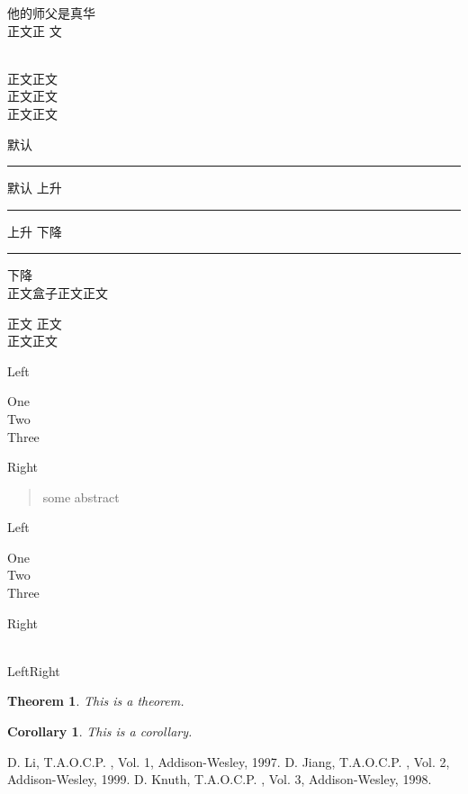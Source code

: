 \documentclass[UTF8,a5paper,12pt,portrait,openary,final]{ctexbook}
\begin{document}
他的师父是真华
\\
正文正 {\tiny 文}

\\



正文正文
\\
正文\hphantom{水平幻影}正文
\\
正文\vphantom{\Huge竖直幻影}正文



  \quad
{}
默认\rule{3pt}{14pt}默认
上升\rule[5pt]{3pt}{14pt}上升
下降\rule[-5pt]{3pt}{14pt}下降
\\


正文\mbox{盒子}正文正文

正文
正文\\
正文正文

Left\begin{minipage}{6em}
One\\ Two\\ Three
\end{minipage}Right

\begin{abstract}
some abstract
\end{abstract}


Left\parbox{6em}{One\\ Two\\ Three}Right

\\
LeftRight


\newtheorem{aaa}{Theorem}
\newtheorem{bbb}{Corollary}

\begin{aaa}
This is a theorem.
\end{aaa}
\begin{bbb}
This is a corollary.
\end{bbb}

\begin{thebibliography}{123456}
 D. Li, T.A.O.C.P. , Vol. 1, Addison-Wesley, 1997.
 D. Jiang, T.A.O.C.P. , Vol. 2, Addison-Wesley, 1999.
 D. Knuth, T.A.O.C.P. , Vol. 3, Addison-Wesley, 1998.
\end{thebibliography}
\end{document}
